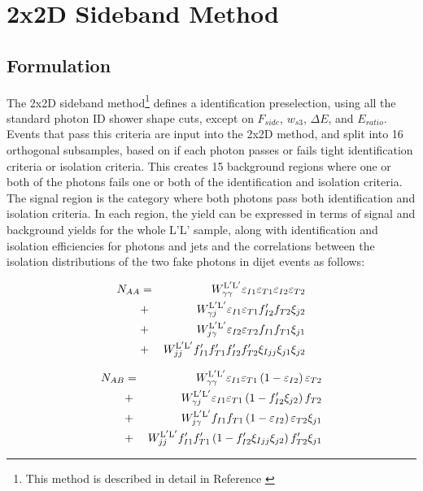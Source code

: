 \chapter{2x2D Sideband Method} \label{app:2x2d}

\section{Formulation}

The 2x2D sideband method\footnote{This method is described in detail in Reference \cite{2x2d-definition}} defines a \LoosePrime identification preselection, using all the standard photon ID shower shape cuts, except on $F_{side}$, $w_{s3}$, $\Delta E$, and $E_{ratio}$. Events that pass this criteria are input into the 2x2D method, and split into 16 orthogonal subsamples, based on if each photon passes or fails tight identification criteria or isolation criteria. This creates 15 background regions where one or both of the photons fails one or both of the identification and isolation criteria. The signal region is the category where both photons pass both identification and isolation criteria. In each region, the yield can be expressed in terms of signal and background yields for the whole L'L' sample, along with identification and isolation efficiencies for photons and jets and the correlations between the isolation distributions of the two fake photons in dijet events as follows:

\begin{eqnarray}
    N_{AA} &=& W_{\gamma\gamma}^{\mathrm{L}^{\prime}\mathrm{L}^{\prime}} \varepsilon_{I1} \varepsilon_{T1} \varepsilon_{I2} \varepsilon_{T2} \nonumber \\
    &+& W_{\gamma j}^{\mathrm{L}^{\prime}\mathrm{L}^{\prime}} \varepsilon_{I1} \varepsilon_{T1} f^{\prime}_{I2} f_{T2} \xi_{j2} \nonumber \\
    &+& W_{j \gamma}^{\mathrm{L}^{\prime}\mathrm{L}^{\prime}} \varepsilon_{I2} \varepsilon_{T2} f_{I1} f_{T1} \xi_{j1}  \nonumber \\
    &+& W_{jj}^{\mathrm{L}^{\prime}\mathrm{L}^{\prime}} f^{\prime}_{I1} f^{\prime}_{T1} f^{\prime}_{I2} f^{\prime}_{T2} \xi_{Ijj} \xi_{j1} \xi_{j2}
  \end{eqnarray}
  
  \begin{eqnarray}
    N_{AB} &=& W_{\gamma\gamma}^{\mathrm{L}^{\prime}\mathrm{L}^{\prime}} \varepsilon_{I1} \varepsilon_{T1} \left(1-\varepsilon_{I2}\right) \varepsilon_{T2} \nonumber \\
    &+& W_{\gamma j}^{\mathrm{L}^{\prime}\mathrm{L}^{\prime}}\varepsilon_{I1} \varepsilon_{T1}   \left(1-f^{\prime}_{I2} \xi_{j2}\right)f_{T2}   \nonumber \\
    &+& W_{j \gamma}^{\mathrm{L}^{\prime}\mathrm{L}^{\prime}}f_{I1} f_{T1} \left(1-\varepsilon_{I2} \right)\varepsilon_{T2}  \xi_{j1}  \nonumber \\
    &+& W_{jj}^{\mathrm{L}^{\prime}\mathrm{L}^{\prime}}f^{\prime}_{I1} f^{\prime}_{T1}\left(1-f^{\prime}_{I2}\xi_{Ijj} \xi_{j2}\right) f^{\prime}_{T2}\xi_{j1}
  \end{eqnarray}
  

